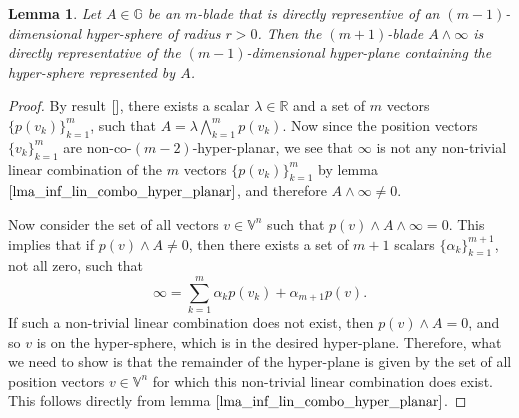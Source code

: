 \documentclass[12pt]{article}
\newcommand{\G}{\mathbb{G}}
\newcommand{\V}{\mathbb{V}}
\newcommand{\R}{\mathbb{R}}
\newcommand{\nvai}{\infty}
\newtheorem{lemma}{Lemma}[section]
\begin{document}
\begin{lemma}\label{lma_sphere_to_plane}
Let $A\in\G$ be an $m$-blade that is directly representive of an
$(m-1)$-dimensional hyper-sphere of radius $r>0$.
Then the $(m+1)$-blade $A\wedge\nvai$ is directly representative
of the $(m-1)$-dimensional hyper-plane containing the
hyper-sphere represented by $A$.
\end{lemma}
\begin{proof}
By result $\eqref{}$, there exists a
scalar $\lambda\in\R$ and a set of $m$ vectors $\{p(v_k)\}_{k=1}^m$,
such that $A = \lambda\bigwedge_{k=1}^m p(v_k)$.
Now since the position vectors $\{v_k\}_{k=1}^m$ are non-co-$(m-2)$-hyper-planar,
we see that $\nvai$ is not any non-trivial linear combination of the
$m$ vectors $\{p(v_k)\}_{k=1}^m$ by lemma $\eqref{lma_inf_lin_combo_hyper_planar}$,
and therefore $A\wedge\nvai\neq 0$.

Now consider the set of all
vectors $v\in\V^n$ such that $p(v)\wedge A\wedge\nvai=0$.
This implies that if $p(v)\wedge A\neq 0$, then there
exists a set of $m+1$ scalars $\{\alpha_k\}_{k=1}^{m+1}$, not all zero,
such that
\begin{equation*}
\nvai = \sum_{k=1}^m \alpha_k p(v_k) + \alpha_{m+1}p(v).
\end{equation*}
If such a non-trivial linear combination does not exist, then $p(v)\wedge A=0$,
and so $v$ is on the hyper-sphere, which is in the desired hyper-plane.
Therefore, what we need to show is that the remainder of the hyper-plane
is given by the set of all position vectors $v\in\V^n$ for which this non-trivial linear
combination does exist.  This follows directly from lemma $\eqref{lma_inf_lin_combo_hyper_planar}$.
\end{proof}



\end{document}
